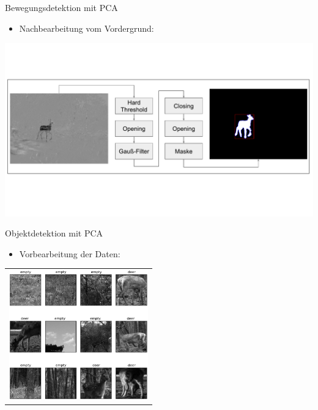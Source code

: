 \begin{frame}[t,fragile]{Bewegungsdetektion mit  PCA}
	\begin{itemize}
 \item{Nachbearbeitung vom Vordergrund:}
  \end{itemize}
        \includegraphics[width=14cm]{images/Segmentierung/pipeline-post2.pdf}

\end{frame}

\begin{frame}[t,fragile]{Objektdetektion mit  PCA}
	\begin{itemize}
 \item{Vorbearbeitung der Daten:}
  \end{itemize}
       
  \vspace{0.01em}
  {
\begin{table}
\centering
        \begin{tabular}{c}
     \includegraphics[width=6cm]{images/Segmentierung/data-PCA}
         \end{tabular}
        
\end{table}
 }
\end{frame}

